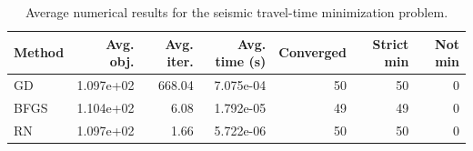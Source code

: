 \begin{table}[ht]
    \centering
    \caption{Average numerical results for the seismic travel-time minimization problem.}
    \label{tab:seismic-results}
    \small
    \begin{tabular}{lrrrrrr}
        \hline
        Method & Avg. obj. & Avg. iter. & Avg. time (s) & Converged & Strict min & Not min \\
        \hline
        GD & 1.097e+02 & 668.04 & 7.075e-04 & 50 & 50 & 0 \\
        BFGS & 1.104e+02 & 6.08 & 1.792e-05 & 49 & 49 & 0 \\
        RN & 1.097e+02 & 1.66 & 5.722e-06 & 50 & 50 & 0 \\
        \hline
    \end{tabular}
\end{table}
